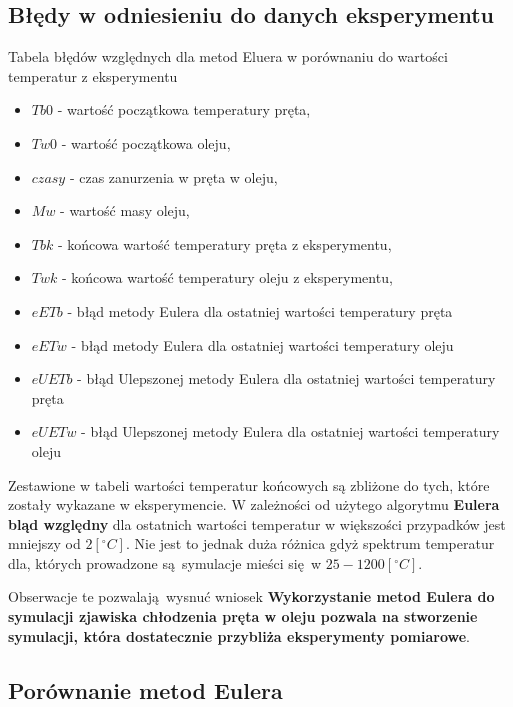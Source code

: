 \documentclass[varwidth,12pt,a4paper]{article}
\begin{document}
\subsection{Błędy w odniesieniu do danych eksperymentu}

\begin{table}[H]
    \centering{}
    \caption{Tabela błędów względnych dla metod Eluera w porównaniu do wartości temperatur z eksperymentu}
    \label{table:tabelaPomiarowBledowEuler}
\end{table}

\begin{itemize}
    \item $Tb0$ - wartość początkowa temperatury pręta,
    \item $Tw0$ - wartość początkowa oleju,
    \item $czasy$ - czas zanurzenia w pręta w oleju,
    \item $Mw$ - wartość masy oleju,
    \item $Tbk$ - końcowa wartość temperatury pręta z eksperymentu,
    \item $Twk$ - końcowa wartość temperatury oleju z eksperymentu,
    \item $eETb$ - błąd metody Eulera dla ostatniej wartości temperatury pręta
    \item $eETw$ - błąd metody Eulera dla ostatniej wartości temperatury oleju
    \item $eUETb$ - błąd Ulepszonej metody Eulera dla ostatniej wartości temperatury pręta
    \item $eUETw$ - błąd Ulepszonej metody Eulera dla ostatniej wartości temperatury oleju
\end{itemize}

Zestawione w tabeli wartości temperatur końcowych są zbliżone do tych, które zostały wykazane w eksperymencie.
W zależności od użytego algorytmu \textbf{Eulera} \textbf{bląd względny} dla ostatnich wartości temperatur w większości
przypadków jest mniejszy od $2 [^\circ C]$. Nie jest to jednak duża różnica gdyż spektrum temperatur dla, których
prowadzone są symulacje mieści się w $25-1200 [^\circ C]$.

Obserwacje te pozwalają wysnuć wniosek \textbf{Wykorzystanie metod Eulera do symulacji zjawiska chłodzenia
pręta w oleju pozwala na stworzenie symulacji, która dostatecznie przybliża eksperymenty pomiarowe}.


\subsection{Porównanie metod Eulera}
\end{document}
